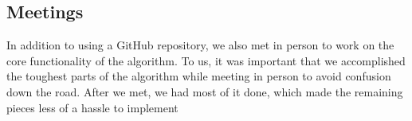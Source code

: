 \documentclass[titlepage]{article}
\begin{document}
		\subsection{Meetings}
		In addition to using a GitHub repository, we also met in person to work on the core functionality of the algorithm. To us, it was important that we accomplished the toughest parts of the algorithm while meeting in person to avoid confusion down the road. After we met, we had most of it done, which made the remaining pieces less of a hassle to implement
	
\end{document}

